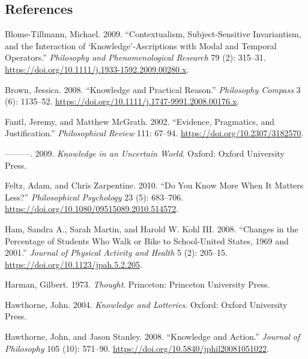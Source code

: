 \documentclass[
  11pt,
  letterpaper,
  DIV=11,
  numbers=noendperiod,
  oneside]{scrartcl}
\newlength{\cslhangindent}
\newenvironment{CSLReferences}[2] %
 {\begin{list}{}{%
  \setlength{\itemindent}{0pt}
  \setlength{\leftmargin}{0pt}
  \setlength{\parsep}{0pt}
  \ifodd #1
   \setlength{\leftmargin}{\cslhangindent}
   \setlength{\itemindent}{-1\cslhangindent}
  \fi
  \setlength{\itemsep}{#2\baselineskip}}}
 {\end{list}}
\begin{document}
\subsection*{References}\label{references}

\label{refs}
\begin{CSLReferences}{1}{0}
Blome-Tillmann, Michael. 2009. {``Contextualism, Subject-Sensitive
Invariantism, and the Interaction of {`Knowledge'}-Ascriptions with
Modal and Temporal Operators.''} \emph{Philosophy and Phenomenological
Research} 79 (2): 315--31.
\url{https://doi.org/10.1111/j.1933-1592.2009.00280.x}.

Brown, Jessica. 2008. {``Knowledge and Practical Reason.''}
\emph{Philosophy Compass} 3 (6): 1135--52.
\url{https://doi.org/10.1111/j.1747-9991.2008.00176.x}.

Fantl, Jeremy, and Matthew McGrath. 2002. {``Evidence, Pragmatics, and
Justification.''} \emph{Philosophical Review} 111: 67--94.
\url{https://doi.org/10.2307/3182570}.

---------. 2009. \emph{Knowledge in an Uncertain World}. Oxford: Oxford
University Press.

Feltz, Adam, and Chris Zarpentine. 2010. {``Do You Know More When It
Matters Less?''} \emph{Philosophical Psychology} 23 (5): 683--706.
\url{https://doi.org/10.1080/09515089.2010.514572}.

Ham, Sandra A., Sarah Martin, and Harold W. Kohl III. 2008. {``Changes
in the Percentage of Students Who Walk or Bike to School-United States,
1969 and 2001.''} \emph{Journal of Physical Activity and Health} 5 (2):
205--15. \url{https://doi.org/10.1123/jpah.5.2.205}.

Harman, Gilbert. 1973. \emph{Thought}. Princeton: Princeton University
Press.

Hawthorne, John. 2004. \emph{Knowledge and Lotteries}. Oxford: Oxford
University Press.

Hawthorne, John, and Jason Stanley. 2008. {``{Knowledge and Action}.''}
\emph{Journal of Philosophy} 105 (10): 571--90.
\url{https://doi.org/10.5840/jphil20081051022}.


\end{CSLReferences}
\end{document}
